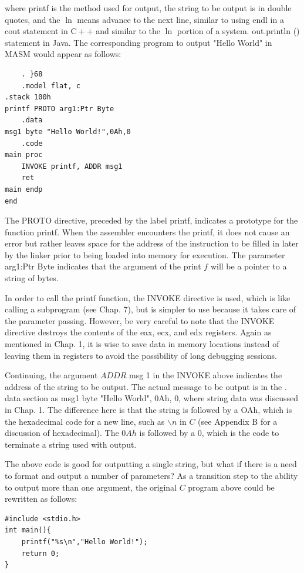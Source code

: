 \documentclass[10pt]{book}
\begin{document}
where printf is the method used for output, the string to be output is in double quotes, and the $\ln$ means advance to the next line, similar to using endl in a cout statement in $\mathrm{C}++$ and similar to the $\ln$ portion of a system. out.println () statement in Java. The corresponding program to output "Hello World" in MASM would appear as follows:

\begin{verbatim}
    . }68
    .model flat, c
.stack 100h
printf PROTO arg1:Ptr Byte
    .data
msg1 byte "Hello World!",0Ah,0
    .code
main proc
    INVOKE printf, ADDR msg1
    ret
main endp
end
\end{verbatim}

The PROTO directive, preceded by the label printf, indicates a prototype for the function printf. When the assembler encounters the printf, it does not cause an error but rather leaves space for the address of the instruction to be filled in later by the linker prior to being loaded into memory for execution. The parameter arg1:Ptr Byte indicates that the argument of the print $f$ will be a pointer to a string of bytes.

In order to call the printf function, the INVOKE directive is used, which is like calling a subprogram (see Chap. 7), but is simpler to use because it takes care of the parameter passing. However, be very careful to note that the INVOKE directive destroys the contents of the eax, ecx, and edx registers. Again as mentioned in Chap. 1, it is wise to save data in memory locations instead of leaving them in registers to avoid the possibility of long debugging sessions.

Continuing, the argument $ADDR$ msg 1 in the INVOKE above indicates the address of the string to be output. The actual message to be output is in the . data section as msg1 byte "Hello World", 0Ah, 0, where string data was discussed in Chap. 1. The difference here is that the string is followed by a OAh, which is the hexadecimal code for a new line, such as $\backslash n$ in $C$ (see Appendix B for a discussion of hexadecimal). The $0Ah$ is followed by a 0, which is the code to terminate a string used with output.

The above code is good for outputting a single string, but what if there is a need to format and output a number of parameters? As a transition step to the ability to output more than one argument, the original $C$ program above could be rewritten as follows:

\begin{verbatim}
#include <stdio.h>
int main(){
    printf("%s\n","Hello World!");
    return 0;
}
\end{verbatim}
\end{document}
